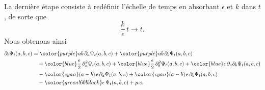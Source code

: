 \documentclass[openany,a4paper,12pt]{article}
\begin{document}
\par La dernière étape consiste à redéfinir l'échelle de temps en absorbant $\epsilon$ et $k$ dans $t$, de sorte que 
%
\begin{equation}\label{moyal_redef_temps}
	\frac{k}{\epsilon} \, t \rightarrow t.
\end{equation}
%
Nous obtenons ainsi 
%
\begin{equation}\label{moyal_dev_epsilon_complet}
\begin{split}
	\partial_t \Psi_t(a,b,c) 
	&= {\color{purple} ab \, \partial_a \Psi_t(a,b,c) }
	+ {\color{purple} ab \, \partial_b \Psi_t(a,b,c) }\\
	&\quad + {\color{blue} \frac{\epsilon}{2} \, \partial_a^2 \Psi_t(a,b,c) }
	+ {\color{blue} \frac{\epsilon}{2} \, \partial_b^2 \Psi_t(a,b,c) }
	+ {\color{blue} \epsilon \, \partial_a \partial_b \Psi_t(a,b,c) }\\
	&\quad - {\color{cyan} (a-b) \,\epsilon \, \partial_a \Psi_t(a,b,c) }
	+ {\color{cyan} (a-b) \,\epsilon \, \partial_b \Psi_t(a,b,c) } \\
	&\quad- {\color{green!60!black} \epsilon \, \Psi_t(a, b, c) } 
	+ p.c.
\end{split}
\end{equation}
%
\end{document}
